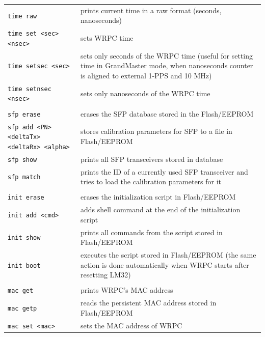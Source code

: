 \documentclass[a4paper, 12pt]{article}
\newcommand{\code}[1]{\texttt{#1}}
\newcommand{\codeHook}[1]{\mbox{\ttfamily\MakeTextUppercase{#1}}}
\begin{document}
\begin{longtable}{  p{7.5cm}  p{7cm} }
  \code{time raw} &  prints current time in a raw format (seconds, nanoseconds)\\

  \code{time set <sec> <nsec>} & sets \codeHook{wrpc} time\\

  \code{time setsec <sec>} & sets only seconds of the \codeHook{wrpc} time
(useful for setting time in GrandMaster mode, when nanoseconds counter is
aligned to external 1-PPS and 10 MHz)\\

  \code{time setnsec <nsec>} & sets only nanoseconds of the \codeHook{wrpc} time\\
 & \\
  \code{sfp erase} & erases the \codeHook{sfp} database stored in the Flash/EEPROM\\

  \code{sfp add <PN> <deltaTx> <deltaRx> <alpha>} & stores calibration
parameters for \codeHook{sfp} to a file in Flash/EEPROM\\

  \code{sfp show} & prints all \codeHook{sfp} transceivers stored in database\\

  \code{sfp match} & prints the ID of a currently used \codeHook{sfp}
transceiver and tries to load the calibration parameters for it\\
 & \\
  \code{init erase} & erases the initialization script in Flash/EEPROM \\

  \code{init add <cmd>} & adds shell command at the end of the
initialization script\\

  \code{init show} & prints all commands from the script stored in Flash/EEPROM\\

  \code{init boot} & executes the script stored in Flash/EEPROM (the same action is done automatically when \codeHook{wrpc} starts after resetting \codeHook{lm32})\\
 & \\
  \code{mac get} & prints \codeHook{wrpc}'s \codeHook{mac} address\\

  \code{mac getp} & reads the persistent \codeHook{mac} address stored in Flash/EEPROM\\

  \code{mac set <mac>} & sets the \codeHook{mac} address of \codeHook{wrpc}\\


\end{longtable}
\end{document}

